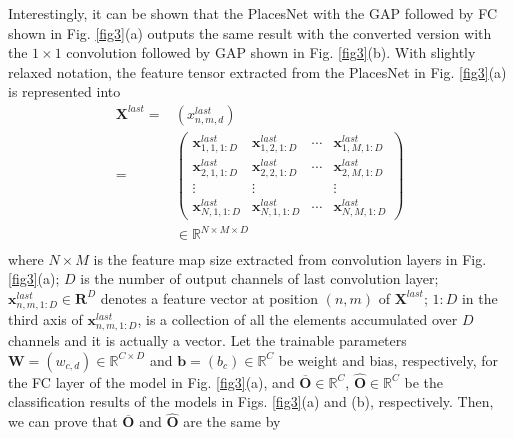 \documentclass[journal,comsoc]{IEEEtran}
\begin{document}
Interestingly, it can be shown that the PlacesNet with the GAP followed by FC shown in Fig. \ref{fig3}(a) outputs the same result with the converted version with the $1 \times 1$ convolution followed by GAP shown in Fig. \ref{fig3}(b). With slightly relaxed notation, the feature tensor extracted from the PlacesNet in Fig. \ref{fig3}(a) is represented into
\begin{equation}
\begin{aligned}
  {{\bm{X}}^{last}} = {} & \left( {x_{n,m,d}^{last}} \right) \\ 
   = & \left( {\begin{array}{*{20}{c}}
  {{\bm{x}}_{1,1,1:D}^{last}}&{{\bm{x}}_{1,2,1:D}^{last}}& \cdots &{{\bm{x}}_{1,M,1:D}^{last}} \\ 
  {{\bm{x}}_{2,1,1:D}^{last}}&{{\bm{x}}_{2,2,1:D}^{last}}& \cdots &{{\bm{x}}_{2,M,1:D}^{last}} \\ 
   \vdots & \vdots &{}& \vdots  \\ 
  {{\bm{x}}_{N,1,1:D}^{last}}&{{\bm{x}}_{N,1,1:D}^{last}}& \cdots &{{\bm{x}}_{N,M,1:D}^{last}} 
\end{array}} \right) \\ 
  \, & \in {\mathbb{R}^{N \times M \times D}} \\ 
\end{aligned} 
\label{eq2}
\end{equation}
where $N \times M$ is the feature map size extracted from convolution layers in Fig. \ref{fig3}(a); $D$ is the number of output channels of last convolution layer; ${\bm{x}}_{n,m,1:D}^{last} \in {\bm{R}^D}$ denotes a feature vector at position $\left( n,m \right)$ of ${\bm{X}}^{last}$; $1:D$ in the third axis of ${\bm{x}}_{n,m,1:D}^{last}$,   is a collection of all the elements accumulated over $D$ channels and it is actually a vector. Let the trainable parameters ${\bm{W}} = \left( {{w_{c,d}}} \right) \in {\mathbb{R}^{C \times D}}$ and ${\bm{b}} = \left( {{b_c}} \right) \in {\mathbb{R}^{C}}$ be weight and bias, respectively, for the FC layer of the model in Fig. \ref{fig3}(a), and $\overline {\bm{O}}  \in {\mathbb{R}^C}$, $\widehat {\bm{O}} \in {\mathbb{R}^C}$ be the classification results of the models in Figs. \ref{fig3}(a) and (b), respectively. Then, we can prove that $\overline {\bm{O}}$ and $\widehat {\bm{O}}$ are the same by
\end{document}
